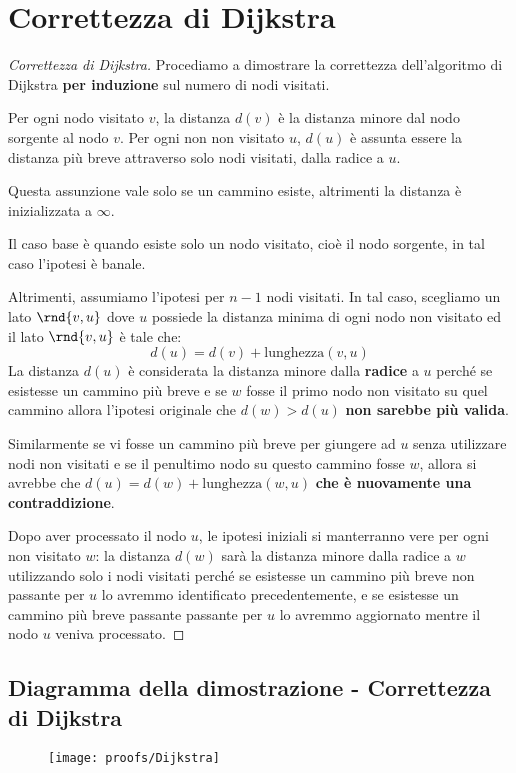 \documentclass[\main/main.tex]{subfiles}
\begin{document}
\section{Correttezza di Dijkstra}
\begin{proof}[Correttezza di Dijkstra]
  Procediamo a dimostrare la correttezza dell'algoritmo di Dijkstra \textbf{per induzione} sul numero di nodi visitati.

  Per ogni nodo visitato \(v\), la distanza \(d(v)\) è la distanza minore dal nodo sorgente al nodo \(v\). Per ogni non non visitato \(u\), \(d(u)\) è assunta essere la distanza più breve attraverso solo nodi visitati, dalla radice a \(u\).

  Questa assunzione vale solo se un cammino esiste, altrimenti la distanza è inizializzata a \(\infty \).

  Il caso base è quando esiste solo un nodo visitato, cioè il nodo sorgente, in tal caso l'ipotesi è banale.

  Altrimenti, assumiamo l'ipotesi per \(n-1\) nodi visitati. In tal caso, scegliamo un lato \(\rnd{v,u}\) dove \(u\) possiede la distanza minima di ogni nodo non visitato ed il lato \(\rnd{v,u}\) è tale che:
  \[
    d(u) = d(v) + \text{lunghezza}(v, u)
  \]
  La distanza \(d(u)\) è considerata la distanza minore dalla \textbf{radice} a \(u\) perché se esistesse un cammino più breve e se \(w\) fosse il primo nodo non visitato su quel cammino allora l'ipotesi originale che \(d(w) > d(u)\) \textbf{non sarebbe più valida}.

  Similarmente se vi fosse un cammino più breve per giungere ad \(u\) senza utilizzare nodi non visitati e se il penultimo nodo su questo cammino fosse \(w\), allora si avrebbe che \(d(u) = d(w) + \text{lunghezza}(w, u)\) \textbf{che è nuovamente una contraddizione}.

  Dopo aver processato il nodo \(u\), le ipotesi iniziali si manterranno vere per ogni non visitato \(w\): la distanza \(d(w)\) sarà la distanza minore dalla radice a \(w\) utilizzando solo i nodi visitati perché se esistesse un cammino più breve non passante per \(u\) lo avremmo identificato precedentemente, e se esistesse un cammino più breve passante passante per \(u\) lo avremmo aggiornato mentre il nodo \(u\) veniva processato.
\end{proof}
\clearpage
\subsection{Diagramma della dimostrazione - Correttezza di Dijkstra}
\begin{figure}
  \texttt{[image: proofs/Dijkstra]}
\end{figure}
\end{document}
